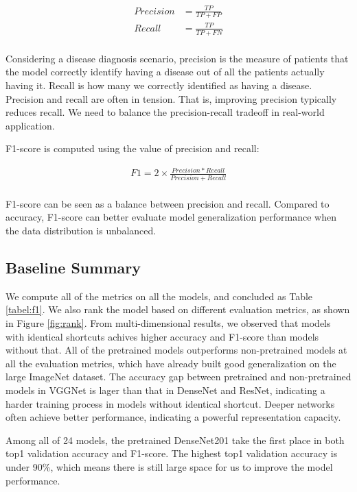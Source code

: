\begin{equation*}
  \begin{split}
    Precision & = \frac{TP}{TP+FP}\\
    Recall & = \frac{TP}{TP+FN}\\
  \end{split}
\end{equation*}

Considering a disease diagnosis scenario, precision is the measure of patients that the model correctly identify having a disease out of all the patients actually having it. Recall is how many we correctly identified as having a disease. Precision and recall are often in tension. That is, improving precision typically reduces recall. We need to balance the precision-recall tradeoff in real-world application.

F1-score is computed using the value of precision and recall:


\begin{equation*}
  \begin{split}
    F1 =2\times \frac{Precision  *Recall}{Precision + Recall}\\
  \end{split}
\end{equation*}

F1-score can be seen as a balance between precision and recall. Compared to accuracy, F1-score can better evaluate model generalization performance when the data distribution is unbalanced.

\subsection{Baseline Summary}
We compute all of the metrics on all the models, and concluded as Table \ref{tabel:f1}. We also rank the model based on different evaluation metrics, as shown in Figure \ref{fig:rank}. From multi-dimensional results, we observed that models with identical shortcuts achives higher accuracy and F1-score than models without that. All of the pretrained models outperforms non-pretrained models at all the evaluation metrics, which have already built good generalization on the large ImageNet dataset. The accuracy gap between pretrained and non-pretrained models in VGGNet is lager than that in DenseNet and ResNet, indicating a harder training process in models without identical shortcut. Deeper networks often achieve better performance, indicating a powerful representation capacity.

Among all of 24 models, the pretrained DenseNet201 take the first place in both top1 validation accuracy and F1-score. The highest top1 validation accuracy is under 90\%, which means there is still large space for us to improve the model performance.

